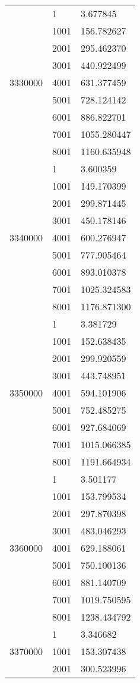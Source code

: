 \begin{table}[htb!]
\begin{tabular}{lll}
\multirow[c]{9}{*}{3330000} & 1 & 3.677845 \\
 & 1001 & 156.782627 \\
 & 2001 & 295.462370 \\
 & 3001 & 440.922499 \\
 & 4001 & 631.377459 \\
 & 5001 & 728.124142 \\
 & 6001 & 886.822701 \\
 & 7001 & 1055.280447 \\
 & 8001 & 1160.635948 \\
\multirow[c]{9}{*}{3340000} & 1 & 3.600359 \\
 & 1001 & 149.170399 \\
 & 2001 & 299.871445 \\
 & 3001 & 450.178146 \\
 & 4001 & 600.276947 \\
 & 5001 & 777.905464 \\
 & 6001 & 893.010378 \\
 & 7001 & 1025.324583 \\
 & 8001 & 1176.871300 \\
\multirow[c]{9}{*}{3350000} & 1 & 3.381729 \\
 & 1001 & 152.638435 \\
 & 2001 & 299.920559 \\
 & 3001 & 443.748951 \\
 & 4001 & 594.101906 \\
 & 5001 & 752.485275 \\
 & 6001 & 927.684069 \\
 & 7001 & 1015.066385 \\
 & 8001 & 1191.664934 \\
\multirow[c]{9}{*}{3360000} & 1 & 3.501177 \\
 & 1001 & 153.799534 \\
 & 2001 & 297.870398 \\
 & 3001 & 483.046293 \\
 & 4001 & 629.188061 \\
 & 5001 & 750.100136 \\
 & 6001 & 881.140709 \\
 & 7001 & 1019.750595 \\
 & 8001 & 1238.434792 \\
\multirow[c]{9}{*}{3370000} & 1 & 3.346682 \\
 & 1001 & 153.307438 \\
 & 2001 & 300.523996 \\

\end{tabular}
\end{table}
